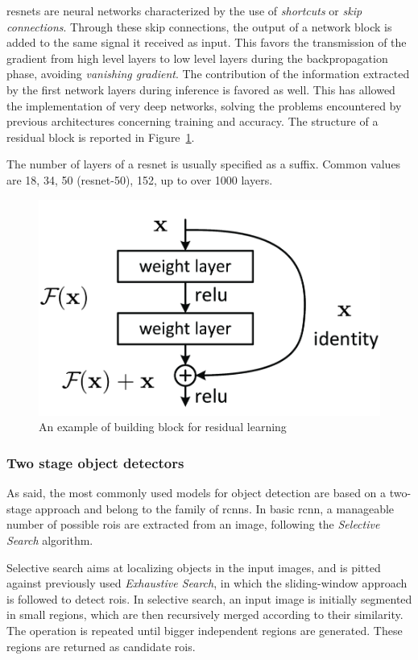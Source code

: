 \documentclass[%
    corpo=12pt,
    twoside,
    stile=classica,   
    tipotesi=magistrale,
    evenboxes,
    english,
	numerazioneromana,
]{toptesi}
\begin{document}
\Glspl{resnet} are neural networks characterized by the use of \textit{shortcuts} or \textit{skip connections}. Through these skip connections, the output of a network block is added to the same signal it received as input. This favors the transmission of the gradient from high level layers to low level layers during the backpropagation phase, avoiding \textit{vanishing gradient}. The contribution of the information extracted by the first network layers during inference is favored as well. This has allowed the implementation of very deep networks, solving the problems encountered by previous architectures concerning training and accuracy. The structure of a residual block is reported in Figure~\ref{fig:resnet}.

The number of layers of a \gls{resnet} is usually specified as a suffix. Common values are 18, 34, 50 (\gls{resnet}-50), 152, up to over 1000 layers\cite{he2016identity}.

\begin{figure}[ht]
	\centering
	\includegraphics[width=.5\textwidth]{imgs/resnet.png}
	\caption{An example of building block for residual learning\cite{he2015deep}}
	\label{fig:resnet}
\end{figure}

\subsubsection{Two stage object detectors}
As said, the most commonly used models for object detection are based on a two-stage approach and belong to the family of \glspl{rcnn}. In basic \gls{rcnn}\cite{girshick2014rich}, a manageable number of possible \glspl{roi} are extracted from an image, following the \textit{Selective Search} algorithm.

Selective search aims at localizing objects in the input images, and is pitted against previously used \textit{Exhaustive Search}, in which the sliding-window approach is followed to detect \glspl{roi}. In selective search, an input image is initially segmented in small regions, which are then recursively merged according to their similarity. The operation is repeated until bigger independent regions are generated. These regions are returned as candidate \glspl{roi}.
\end{document}
